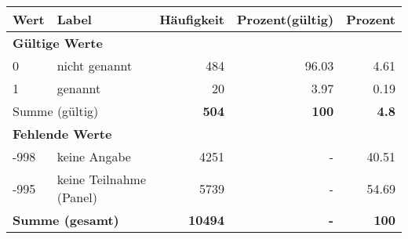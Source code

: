      \begin{longtable}{lXrrr}
     \toprule
     \textbf{Wert} & \textbf{Label} & \textbf{Häufigkeit} & \textbf{Prozent(gültig)} & \textbf{Prozent} \\
     \endhead
     \midrule
     \multicolumn{5}{l}{\textbf{Gültige Werte}}\\

     0 &
     \multicolumn{1}{X}{ nicht genannt   } &


       \num{484} &
       \num[round-mode=places,round-precision=2]{96.03} &
         \num[round-mode=places,round-precision=2]{4.61} \\

     1 &
     \multicolumn{1}{X}{ genannt   } &


       \num{20} &
       \num[round-mode=places,round-precision=2]{3.97} &
         \num[round-mode=places,round-precision=2]{0.19} \\
     \midrule
     \multicolumn{2}{l}{Summe (gültig)} &
       \textbf{\num{504}} &
     \textbf{\num{100}} &
       \textbf{\num[round-mode=places,round-precision=2]{4.8}} \\
     \multicolumn{5}{l}{\textbf{Fehlende Werte}}\\
       -998 &
       keine Angabe &
         \num{4251} &
        - &
         \num[round-mode=places,round-precision=2]{40.51} \\
       -995 &
       keine Teilnahme (Panel) &
         \num{5739} &
        - &
         \num[round-mode=places,round-precision=2]{54.69} \\
     \midrule
     \multicolumn{2}{l}{\textbf{Summe (gesamt)}} &
          \textbf{\num{10494}} &
        \textbf{-} &
        \textbf{\num{100}} \\
     \bottomrule
     \end{longtable}
     
